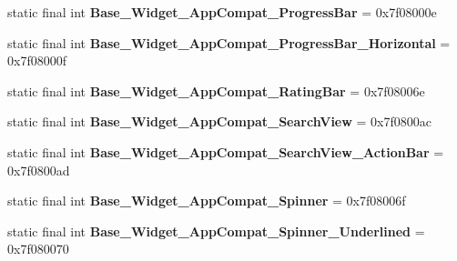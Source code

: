 \begin{DoxyCompactItemize}
\item 
\hypertarget{classandroid_1_1support_1_1design_1_1_r_1_1style_a2384abd094179a592f3c1c84ec9aabb7}{}static final int {\bfseries Base\+\_\+\+Widget\+\_\+\+App\+Compat\+\_\+\+Progress\+Bar} = 0x7f08000e\label{classandroid_1_1support_1_1design_1_1_r_1_1style_a2384abd094179a592f3c1c84ec9aabb7}

\item 
\hypertarget{classandroid_1_1support_1_1design_1_1_r_1_1style_abc208c47da65fac306b8bd7d3296541b}{}static final int {\bfseries Base\+\_\+\+Widget\+\_\+\+App\+Compat\+\_\+\+Progress\+Bar\+\_\+\+Horizontal} = 0x7f08000f\label{classandroid_1_1support_1_1design_1_1_r_1_1style_abc208c47da65fac306b8bd7d3296541b}

\item 
\hypertarget{classandroid_1_1support_1_1design_1_1_r_1_1style_aeb00a759a3ab19c1053273d89650332b}{}static final int {\bfseries Base\+\_\+\+Widget\+\_\+\+App\+Compat\+\_\+\+Rating\+Bar} = 0x7f08006e\label{classandroid_1_1support_1_1design_1_1_r_1_1style_aeb00a759a3ab19c1053273d89650332b}

\item 
\hypertarget{classandroid_1_1support_1_1design_1_1_r_1_1style_afc9c2fe90f72204a9993c2ea0c330d0f}{}static final int {\bfseries Base\+\_\+\+Widget\+\_\+\+App\+Compat\+\_\+\+Search\+View} = 0x7f0800ac\label{classandroid_1_1support_1_1design_1_1_r_1_1style_afc9c2fe90f72204a9993c2ea0c330d0f}

\item 
\hypertarget{classandroid_1_1support_1_1design_1_1_r_1_1style_ac5099d28ea4e2f3af04743b760fad8ec}{}static final int {\bfseries Base\+\_\+\+Widget\+\_\+\+App\+Compat\+\_\+\+Search\+View\+\_\+\+Action\+Bar} = 0x7f0800ad\label{classandroid_1_1support_1_1design_1_1_r_1_1style_ac5099d28ea4e2f3af04743b760fad8ec}

\item 
\hypertarget{classandroid_1_1support_1_1design_1_1_r_1_1style_a2984eaba42ecd51a2ba4c50d4fc4d532}{}static final int {\bfseries Base\+\_\+\+Widget\+\_\+\+App\+Compat\+\_\+\+Spinner} = 0x7f08006f\label{classandroid_1_1support_1_1design_1_1_r_1_1style_a2984eaba42ecd51a2ba4c50d4fc4d532}

\item 
\hypertarget{classandroid_1_1support_1_1design_1_1_r_1_1style_aeea6f9131a92e96a6130437765238642}{}static final int {\bfseries Base\+\_\+\+Widget\+\_\+\+App\+Compat\+\_\+\+Spinner\+\_\+\+Underlined} = 0x7f080070\label{classandroid_1_1support_1_1design_1_1_r_1_1style_aeea6f9131a92e96a6130437765238642}


\end{DoxyCompactItemize}

